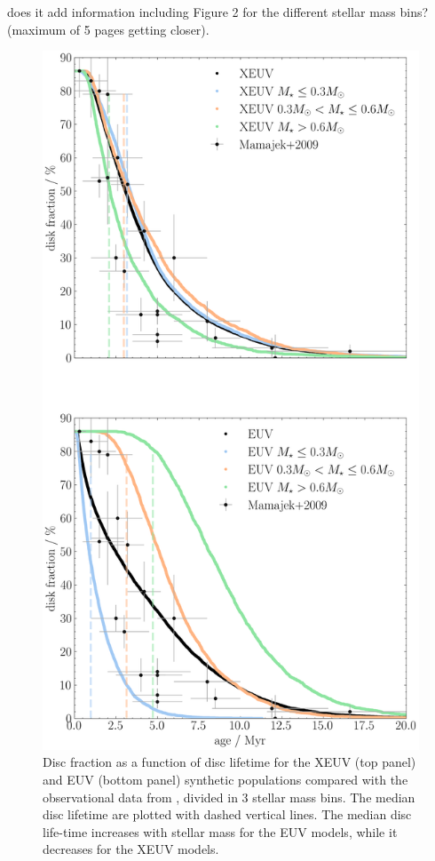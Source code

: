 \documentclass[fleqn,usenatbib,letters]{mnras}
\begin{document}
{\color{red} does it add information including Figure 2 for the different stellar mass bins? (maximum of 5 pages getting closer)}.
\begin{figure}
    \includegraphics[width=0.92\columnwidth]{Fig8}
    \caption{Disc fraction as a function of disc lifetime for the XEUV (top panel) and EUV (bottom panel) synthetic populations compared with the observational data from \citet{Mamajek2009}, divided in 3 stellar mass bins. The median disc lifetime are plotted with dashed vertical lines. The median disc life-time increases with stellar mass for the EUV models, while it decreases for the XEUV models. \label{fig:frac_time}}
\end{figure}
\end{document}
